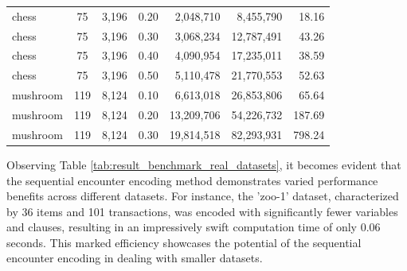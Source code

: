 \begin{table}[H]
\begin{tabular}{|l|c|c|c|r|r|r|}
        chess                             & 75                              & 3,196                           & 0.20                               & 2,048,710                                       & 8,455,790        & 18.16         \\
        chess                             & 75                              & 3,196                           & 0.30                               & 3,068,234                                       & 12,787,491       & 43.26         \\
        chess                             & 75                              & 3,196                           & 0.40                               & 4,090,954                                       & 17,235,011       & 38.59         \\
        chess                             & 75                              & 3,196                           & 0.50                               & 5,110,478                                       & 21,770,553       & 52.63         \\
        mushroom                          & 119                             & 8,124                           & 0.10                               & 6,613,018                                       & 26,853,806       & 65.64         \\
        mushroom                          & 119                             & 8,124                           & 0.20                               & 13,209,706                                      & 54,226,732       & 187.69        \\
        mushroom                          & 119                             & 8,124                           & 0.30                               & 19,814,518                                      & 82,293,931       & 798.24        \\ \hline
    \end{tabular}
\end{table}

Observing Table \ref{tab:result_benchmark_real_datasets}, it becomes evident
that the sequential encounter encoding method demonstrates varied performance benefits across different datasets.
For instance, the 'zoo-1' dataset, characterized by 36 items and 101 transactions,
was encoded with significantly fewer variables and clauses, resulting in an impressively swift computation time of
only 0.06 seconds. This marked efficiency showcases the potential of the sequential encounter encoding in dealing with
smaller datasets.


